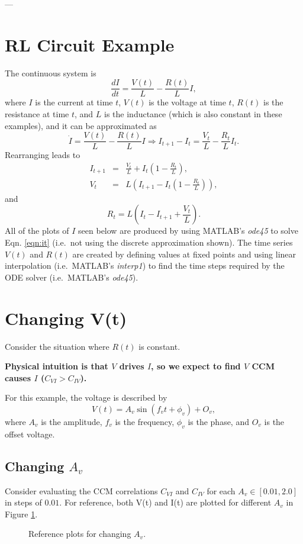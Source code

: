 \documentclass{article}
\begin{document}
---
\section{RL Circuit Example}
The continuous system is
\begin{equation}
\label{eqn:it}
\frac{dI}{dt} = \frac{V(t)}{L} - \frac{R(t)}{L} I,
\end{equation}
where $I$ is the current at time $t$, $V(t)$ is the voltage at time $t$, $R(t)$ is the resistance at time $t$, and $L$ is the inductance (which is also constant in these examples), and it can be approximated as
\begin{equation}
\dot{I} = \frac{V(t)}{L} - \frac{R(t)}{L} I\Rightarrow I_{t+1}-I_t = \frac{V_t}{L} - \frac{R_t}{L} I_t.
\end{equation}
Rearranging leads to
\begin{eqnarray}
I_{t+1} &=& \frac{V_t}{L}+I_t\left(1-\frac{R_t}{L}\right),\\
V_t &=& L\left(I_{t+1}-I_t\left(1-\frac{R_t}{L}\right)\right),
\end{eqnarray}
and
\begin{equation}
R_t = L\left(I_t-I_{t+1}+\frac{V_t}{L}\right).
\end{equation}
All of the plots of $I$ seen below are produced by using MATLAB's {\em ode45} to solve Eqn. \ref{eqn:it} (i.e.\ not using the discrete approximation shown).  The time series $V(t)$ and $R(t)$ are created by defining values at fixed points and using linear interpolation (i.e.\ MATLAB's {\em interp1}) to find the time steps required by the ODE solver (i.e.\ MATLAB's {\em ode45}).  

\section{Changing V(t)}
Consider the situation where $R(t)$ is constant.
\begin{center}
{\large {\bf Physical intuition is that $V$ drives $I$, so we expect to find $V$ CCM causes $I$ ($C_{VI}>C_{IV}$).}}
\end{center}
For this example, the voltage is described by 
\begin{equation}
V(t) = A_v \sin\left(f_v t+\phi_v\right)+O_v,
\end{equation}
where $A_v$ is the amplitude, $f_v$ is the frequency, $\phi_v$ is the phase, and $O_v$ is the offset voltage.

\subsection{Changing $A_v$}
Consider evaluating the CCM correlations $C_{VI}$ and $C_{IV}$ for each $A_v\in[0.01,2.0]$ in steps of $0.01$.  For reference, both V(t) and I(t) are plotted for different $A_v$ in Figure \ref{fig:Avref}.
\begin{figure}[H]
\caption{Reference plots for changing $A_v$.}
\label{fig:Avref}
\end{figure}
\end{document}
